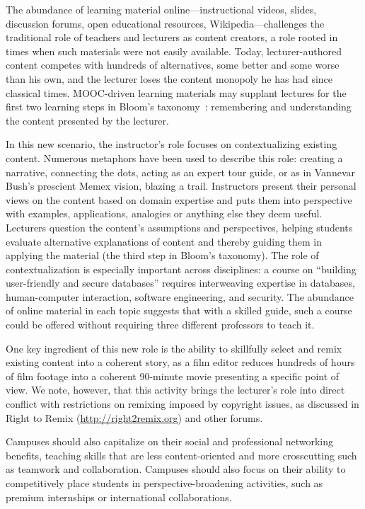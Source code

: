 The abundance of learning material online---instructional videos,
slides, discussion forums, open educational resources,
Wikipedia---challenges the traditional role of teachers and lecturers as
content creators, a role rooted in times when such materials were not
easily available.
Today, lecturer-authored content competes with hundreds of alternatives,
some better and some worse than his own, and the lecturer
loses the content monopoly he has had since classical times.
MOOC-driven learning materials may supplant lectures for the first two
learning steps in Bloom's taxonomy~\cite{blooms-taxonomy-revised}:
remembering and understanding the content 
presented by the lecturer.

In this new scenario, the instructor's role focuses on contextualizing
existing content.
Numerous metaphors have been used to describe this role: creating a
narrative, connecting the dots, acting as an expert tour guide, or as in
Vannevar Bush's prescient Memex vision, blazing a trail.
Instructors present their personal views on the content based on
domain expertise and puts them into perspective with examples, applications,
analogies or anything else they deem useful. Lecturers question
the content's assumptions and perspectives, helping students evaluate
alternative explanations of content and thereby guiding them in applying
the material (the third step in Bloom's taxonomy).
The role of contextualization is especially important across
disciplines: a course on 
``building user-friendly and secure databases'' requires interweaving
expertise in databases, human-computer interaction, software
engineering, and security.
The abundance of online material in each topic suggests that with a
skilled guide, such a course could be offered without requiring three different
professors to teach it.
 
One key ingredient of this new role is the ability to 
skillfully select and remix existing content into a coherent story,
as a film editor reduces hundreds of hours of film footage into a
coherent 90-minute movie presenting a specific point of view.
We note, however, that this activity brings the lecturer's role into direct
conflict with restrictions on remixing imposed by copyright issues, as
discussed in Right to Remix (\url{http://right2remix.org}) and other forums.

Campuses should also capitalize on their social and professional
networking benefits, teaching skills that are less content-oriented and
more crosscutting such as teamwork and collaboration.
Campuses should also focus on their ability to competitively place
students in perspective-broadening
activities, such as premium internships or international collaborations.

